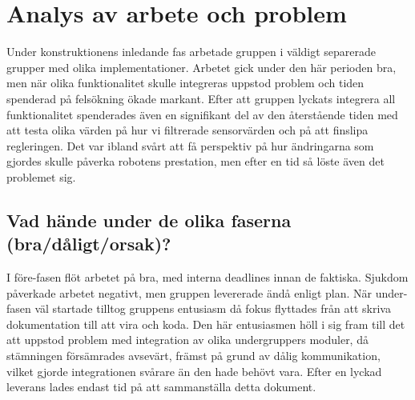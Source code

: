 \documentclass{article}
\begin{document}
\section{Analys av arbete och problem}
Under konstruktionens inledande fas arbetade gruppen i väldigt separerade grupper med olika implementationer. Arbetet gick under den här perioden bra, men när olika funktionalitet skulle integreras uppstod problem och tiden spenderad på felsökning ökade markant. Efter att gruppen lyckats integrera all funktionalitet spenderades även en signifikant del av den återstående tiden med att testa olika värden på hur vi filtrerade sensorvärden och på att finslipa regleringen. Det var ibland svårt att få perspektiv på hur ändringarna som gjordes skulle påverka robotens prestation, men efter en tid så löste även det problemet sig.

\subsection{Vad hände under de olika faserna (bra/dåligt/orsak)?}
I före-fasen flöt arbetet på bra, med interna deadlines innan de faktiska. Sjukdom påverkade arbetet negativt, men gruppen levererade ändå enligt plan. När under-fasen väl startade tilltog gruppens entusiasm då fokus flyttades från att skriva dokumentation till att vira och koda. Den här entusiasmen höll i sig fram till det att uppstod problem med integration av olika undergruppers moduler, då stämningen försämrades avsevärt, främst på grund av dålig kommunikation, vilket gjorde integrationen svårare än den hade behövt vara. Efter en lyckad leverans lades endast tid på att sammanställa detta dokument.
\end{document}

